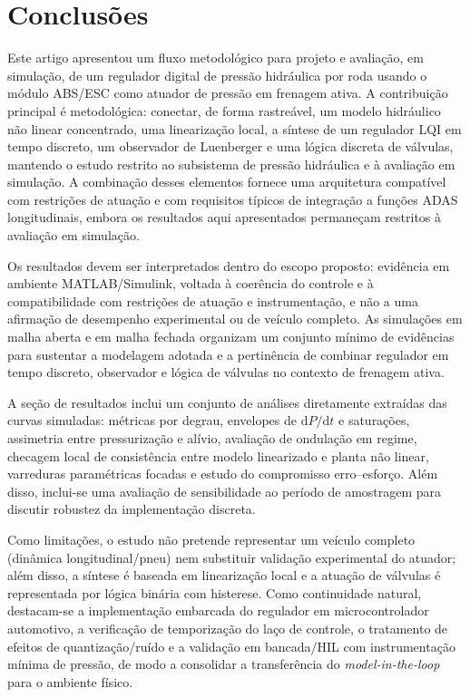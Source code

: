 \documentclass[a4paper]{ifacconf}
\begin{document}
\section{Conclusões}
\label{sec:conclusoes}
Este artigo apresentou um fluxo metodológico para projeto e avaliação, em simulação, de um regulador digital de pressão hidráulica por roda usando o módulo ABS/ESC como atuador de pressão em frenagem ativa. A contribuição principal é metodológica: conectar, de forma rastreável, um modelo hidráulico não linear concentrado, uma linearização local, a síntese de um regulador LQI em tempo discreto, um observador de Luenberger e uma lógica discreta de válvulas, mantendo o estudo restrito ao subsistema de pressão hidráulica e à avaliação em simulação. A combinação desses elementos fornece uma arquitetura compatível com restrições de atuação e com requisitos típicos de integração a funções ADAS longitudinais, embora os resultados aqui apresentados permaneçam restritos à avaliação em simulação.

Os resultados devem ser interpretados dentro do escopo proposto: evidência em ambiente MATLAB/Simulink, voltada à coerência do controle e à compatibilidade com restrições de atuação e instrumentação, e não a uma afirmação de desempenho experimental ou de veículo completo. As simulações em malha aberta e em malha fechada organizam um conjunto mínimo de evidências para sustentar a modelagem adotada e a pertinência de combinar regulador em tempo discreto, observador e lógica de válvulas no contexto de frenagem ativa.

A seção de resultados inclui um conjunto de análises diretamente extraídas das curvas simuladas: métricas por degrau, envelopes de $\mathrm{d}P/\mathrm{d}t$ e saturações, assimetria entre pressurização e alívio, avaliação de ondulação em regime, checagem local de consistência entre modelo linearizado e planta não linear, varreduras paramétricas focadas e estudo do compromisso erro--esforço. Além disso, inclui-se uma avaliação de sensibilidade ao período de amostragem para discutir robustez da implementação discreta.

Como limitações, o estudo não pretende representar um veículo completo (dinâmica longitudinal/pneu) nem substituir validação experimental do atuador; além disso, a síntese é baseada em linearização local e a atuação de válvulas é representada por lógica binária com histerese. Como continuidade natural, destacam-se a implementação embarcada do regulador em microcontrolador automotivo, a verificação de temporização do laço de controle, o tratamento de efeitos de quantização/ruído e a validação em bancada/HIL com instrumentação mínima de pressão, de modo a consolidar a transferência do \textit{model-in-the-loop} para o ambiente físico.
\end{document}

